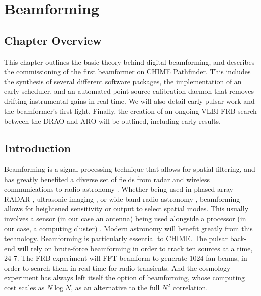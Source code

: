 \chapter{Beamforming}
\label{chapter:beamforming}


\section{Chapter Overview}

This chapter outlines the 
basic theory behind digital beamforming, and describes the commissioning 
of the first beamformer on CHIME Pathfinder. This includes the synthesis 
of several different software packages, the implementation of an early scheduler, 
and an automated point-source calibration daemon that removes drifting instrumental 
gains in real-time. We will also detail early pulsar 
work and the beamformer's first light. 
Finally, the creation of an ongoing VLBI FRB search between 
the DRAO and ARO will be outlined, including early results. 

\section{Introduction}

Beamforming is a signal processing technique that allows for 
spatial filtering, and has greatly benefited a diverse set of fields 
from radar and wireless communications to radio astronomy 
\citep{1988IASSP...5....4V}. Whether being used in phased-array RADAR
\citep{2007BAMS...88.1753Z}, 
ultrasonic imaging \citep{macovski1983medical}, or 
wide-band radio astronomy \citep{2013PASA...30....7T}, beamforming 
allows for heightened sensitivity or output to select spatial
modes. This usually involves a sensor (in our case an antenna)
being used alongside a processor (in our case, a computing cluster) 
\citep{1988IASSP...5....4V}. Modern astronomy will benefit greatly from this
technology. 
Beamforming is particularly essential to CHIME. 
The pulsar back-end will rely on
brute-force beamforming in order to track ten sources at a time, 24-7.  
The FRB experiment will FFT-beamform to generate 1024 fan-beams, 
in order to search them in real time for radio transients. And the cosmology 
experiment has always left itself the option of beamforming, whose 
computing cost scales as $N\log N$, as 
an alternative to the full $N^2$ correlation.
  
